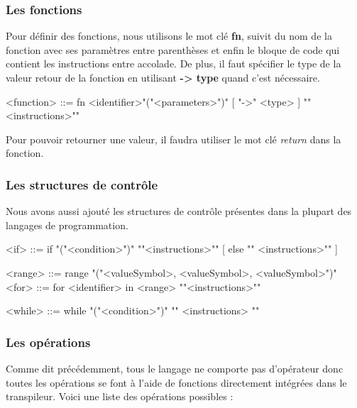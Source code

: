 \documentclass[a4paper]{article}%
\begin{document}
\subsubsection{Les fonctions}

Pour définir des fonctions, nous utilisons le mot clé \textbf{fn}, suivit du nom
de la fonction avec ses paramètres entre parenthèses et enfin le bloque de code
qui contient les instructions entre accolade. De plus, il faut spécifier le type
de la valeur retour de la fonction en utilisant \textbf{-> type} quand c'est
nécessaire.

\begin{grammar}
<function> ::= fn <identifier>"("<parameters>")" [ "->" <type> ] "{"<instructions>"}"
\end{grammar}\leavevmode\newline

Pour pouvoir retourner une valeur, il faudra utiliser le mot clé \textit{return}
dans la fonction.

\subsubsection{Les structures de contrôle}

Nous avons aussi ajouté les structures de contrôle présentes dans la plupart des
langages de programmation.

\begin{grammar}
<if> ::= if "("<condition>")" "{"<instructions>"}" [ else "{" <instructions>"}" ]

<range> ::= range "("<valueSymbol>, <valueSymbol>, <valueSymbol>")"
<for> ::= for <identifier> in <range> "{"<instructions>"}"

<while> ::= while "("<condition>")" "{" <instructions> "}"
\end{grammar}\leavevmode\newline

\subsubsection{Les opérations}

Comme dit précédemment, tous le langage ne comporte pas d'opérateur donc toutes
les opérations se font à l'aide de fonctions directement intégrées dans le
transpileur. Voici une liste des opérations possibles :
\end{document}
